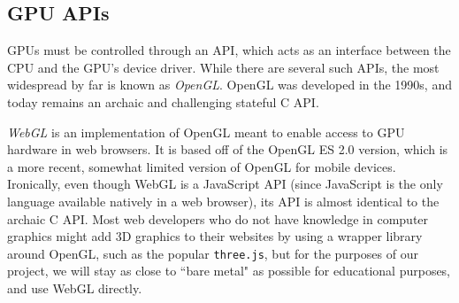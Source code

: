 \subsection{GPU APIs}
GPUs must be controlled through an API, which acts as an interface between the CPU and the GPU's device driver. While there are several such APIs, the most widespread by far is known as \emph{OpenGL}. OpenGL was developed in the 1990s, and today remains an archaic and challenging stateful C API.
\par \emph{WebGL} is an implementation of OpenGL meant to enable access to GPU hardware in web browsers. It is based off of the OpenGL ES 2.0 version, which is a more recent, somewhat limited version of OpenGL for mobile devices. Ironically, even though WebGL is a JavaScript API (since JavaScript is the only language available natively in a web browser), its API is almost identical to the archaic C API. Most web developers who do not have knowledge in computer graphics might add 3D graphics to their websites by using a wrapper library around OpenGL, such as the popular \texttt{three.js}, but for the purposes of our project, we will stay as close to ``bare metal" as possible for educational purposes, and use WebGL directly.

